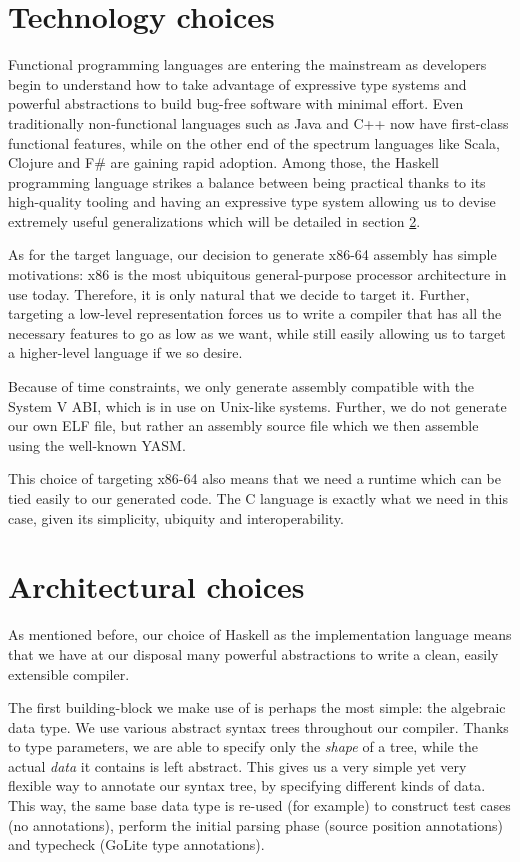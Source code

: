 \documentclass[letterpaper,11pt]{article}
\begin{document}
\section{Technology choices}
\label{sec:tech}

Functional programming languages are entering the mainstream as developers begin to understand how to take advantage of expressive type systems and powerful abstractions to build bug-free software with minimal effort. Even traditionally non-functional languages such as Java and C++ now have first-class functional features, while on the other end of the spectrum languages like Scala, Clojure and F\# are gaining rapid adoption. Among those, the Haskell programming language strikes a balance between being practical thanks to its high-quality tooling and having an expressive type system allowing us to devise extremely useful generalizations which will be detailed in section \ref{sec:arch}.

As for the target language, our decision to generate x86-64 assembly has simple motivations: x86 is the most ubiquitous general-purpose processor architecture in use today. Therefore, it is only natural that we decide to target it. Further, targeting a low-level representation forces us to write a compiler that has all the necessary features to go as low as we want, while still easily allowing us to target a higher-level language if we so desire.

Because of time constraints, we only generate assembly compatible with the System V ABI, which is in use on Unix-like systems. Further, we do not generate our own ELF file, but rather an assembly source file which we then assemble using the well-known YASM.

This choice of targeting x86-64 also means that we need a runtime which can be tied easily to our generated code. The C language is exactly what we need in this case, given its simplicity, ubiquity and interoperability.

\section{Architectural choices}
\label{sec:arch}

As mentioned before, our choice of Haskell as the implementation language means that we have at our disposal many powerful abstractions to write a clean, easily extensible compiler.

The first building-block we make use of is perhaps the most simple: the algebraic data type. We use various abstract syntax trees throughout our compiler. Thanks to type parameters, we are able to specify only the \emph{shape} of a tree, while the actual \emph{data} it contains is left abstract. This gives us a very simple yet very flexible way to annotate our syntax tree, by specifying different kinds of data. This way, the same base data type is re-used (for example) to construct test cases (no annotations), perform the initial parsing phase (source position annotations) and typecheck (GoLite type annotations).
\end{document}
